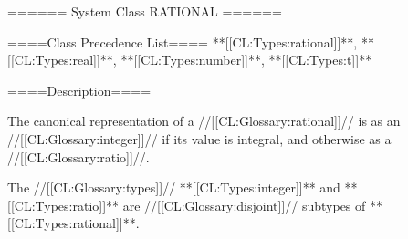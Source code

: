====== System Class RATIONAL ======

====Class Precedence List==== **[[CL:Types:rational]]**, **[[CL:Types:real]]**, **[[CL:Types:number]]**, **[[CL:Types:t]]**

====Description====

The canonical representation of a //[[CL:Glossary:rational]]// is as an //[[CL:Glossary:integer]]// if its value is integral, and otherwise as a //[[CL:Glossary:ratio]]//.

The //[[CL:Glossary:types]]// **[[CL:Types:integer]]** and **[[CL:Types:ratio]]** are //[[CL:Glossary:disjoint]]// subtypes of **[[CL:Types:rational]]**.


